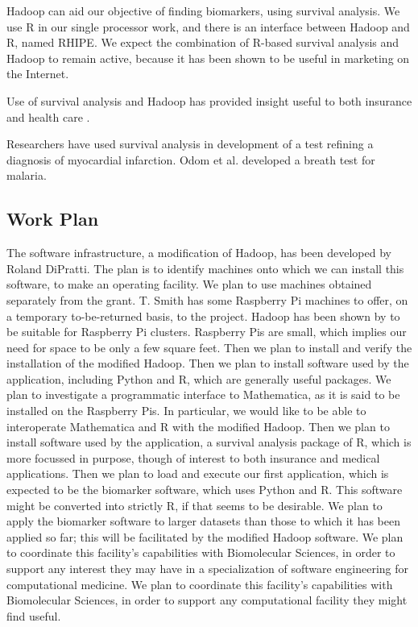 \documentclass[]{article}
\begin{document}
Hadoop can aid our objective of finding biomarkers, using survival analysis\cite{rodger2015discovery}. We use R in our single processor work, and there is an interface between Hadoop and R\cite{RHadoop}, named RHIPE. We expect the combination of R-based survival analysis and Hadoop to remain active, because it has been shown to be useful in marketing on the Internet\cite{de2013using}. 

Use of survival analysis and Hadoop has provided insight useful to both insurance and health care \cite{dhotre2015health,borana2016healthcare,datahealth}.

Researchers have used survival analysis in development of a test refining a diagnosis of myocardial infarction\cite{alcalai2007acute}.
Odom et al. \cite{kelly2015malaria} developed a breath test for malaria.

\subsection{Work Plan}%
The software infrastructure, a modification of Hadoop, has been developed by Roland DiPratti.
The plan is to identify machines onto which we can install this software, to make an operating facility.
We plan to use machines obtained separately from the grant.
T. Smith has some Raspberry Pi machines to offer, on a temporary to-be-returned basis, to the project. Hadoop has been shown by \cite{pihadoop} to be suitable for Raspberry Pi clusters.
Raspberry Pis are small, which implies our need for space to be only a few square feet.
Then we plan to install and verify the installation of the modified Hadoop.
Then we plan to install software used by the application, including Python and R, which are generally useful packages.
We plan to investigate a programmatic interface to Mathematica, as it is said to be installed on the Raspberry Pis.
In particular, we would like to be able to interoperate Mathematica and R with the modified Hadoop.
Then we plan to install software used by the application, a survival analysis package of R, which is more focussed in purpose, though of interest to both insurance and medical applications.
Then we plan to load and execute our first application, which is expected to be the biomarker software, which uses Python and R.  This software might be converted into strictly R, if that seems to be desirable.
 We plan to apply the biomarker software to larger datasets than those to which it has been applied so far; this will be facilitated by the modified Hadoop software.
 We plan to coordinate this facility's capabilities with Biomolecular Sciences, in order to support any interest they may have in a specialization of software engineering for computational medicine.
 We plan to coordinate this facility's capabilities with Biomolecular Sciences, in order to support any computational facility they might find useful.
 
\end{document}
